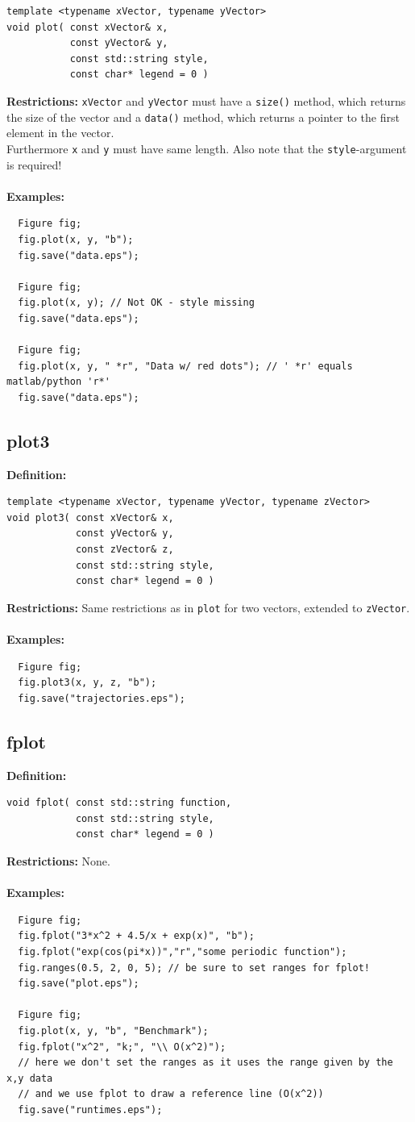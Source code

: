 \documentclass[a4paper]{article}
\newcommand{\command}[1]{\subsection{#1}}
\begin{document}
\begin{lstlisting}
template <typename xVector, typename yVector>
void plot( const xVector& x, 
           const yVector& y, 
           const std::string style, 
           const char* legend = 0 ) 
\end{lstlisting}
\textbf{Restrictions:} \texttt{xVector} and \texttt{yVector} must have a \texttt{size()} method, which returns the size of the vector 
and a \texttt{data()} method, which returns a pointer to the first element in the vector. \\
Furthermore \texttt{x} and \texttt{y} must have same length. Also note that the \texttt{style}-argument is required! \\ \\
%
\textbf{Examples:}
\begin{lstlisting}
  Figure fig;
  fig.plot(x, y, "b");
  fig.save("data.eps");

  Figure fig;
  fig.plot(x, y); // Not OK - style missing
  fig.save("data.eps");

  Figure fig;
  fig.plot(x, y, " *r", "Data w/ red dots"); // ' *r' equals matlab/python 'r*'
  fig.save("data.eps");
\end{lstlisting}

\command{plot3}

\textbf{Definition:}
\begin{lstlisting}
template <typename xVector, typename yVector, typename zVector>
void plot3( const xVector& x,
            const yVector& y,
            const zVector& z,
            const std::string style,
            const char* legend = 0 )
\end{lstlisting}
\textbf{Restrictions:} Same restrictions as in \texttt{plot} for two vectors, extended to \texttt{zVector}. \\ \\
%
\textbf{Examples:}
\begin{lstlisting}
  Figure fig;
  fig.plot3(x, y, z, "b");
  fig.save("trajectories.eps");
\end{lstlisting}


\command{fplot}

\textbf{Definition:}
\begin{lstlisting}
void fplot( const std::string function,
            const std::string style,
            const char* legend = 0 )
\end{lstlisting}
\textbf{Restrictions:} None. \\ \\
%
\textbf{Examples:}
\begin{lstlisting}
  Figure fig;
  fig.fplot("3*x^2 + 4.5/x + exp(x)", "b");
  fig.fplot("exp(cos(pi*x))","r","some periodic function");
  fig.ranges(0.5, 2, 0, 5); // be sure to set ranges for fplot!
  fig.save("plot.eps");

  Figure fig;
  fig.plot(x, y, "b", "Benchmark");
  fig.fplot("x^2", "k;", "\\ O(x^2)");
  // here we don't set the ranges as it uses the range given by the x,y data
  // and we use fplot to draw a reference line (O(x^2))
  fig.save("runtimes.eps"); 
\end{lstlisting}
\end{document}
